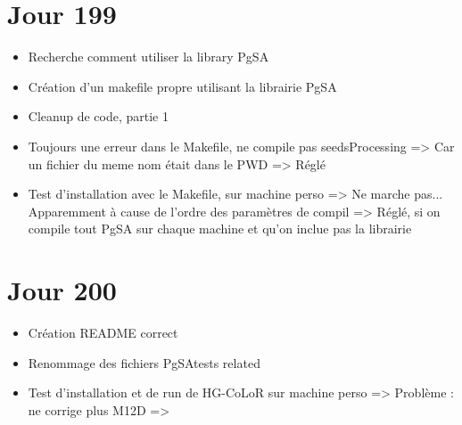 \documentclass[12pt]{report}
\begin{document}
\section{Jour 199}

\begin{itemize}
	\item Recherche comment utiliser la library PgSA
	
	\item Création d'un makefile propre utilisant la librairie PgSA
	
	\item Cleanup de code, partie 1
	
	\item Toujours une erreur dans le Makefile, ne compile pas seedsProcessing => Car un fichier du meme nom était dans le PWD => Réglé
	
	\item Test d'installation avec le Makefile, sur machine perso => Ne marche pas... Apparemment à cause de l'ordre des paramètres de compil	
			=> Réglé, si on compile tout PgSA sur chaque machine et qu'on inclue pas la librairie
\end{itemize}

\section{Jour 200}

\begin{itemize}
	\item Création README correct
	
	\item Renommage des fichiers PgSAtests related
	
	\item Test d'installation et de run de HG-CoLoR sur machine perso => Problème : ne corrige plus M12D
		  => 
\end{itemize}
\end{document}
